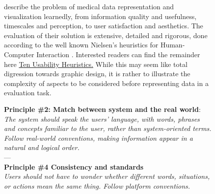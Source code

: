 \begin{figure}
    \footnotesize
\noindent
{}
\begin{tcolorbox}[sidebyside,arc=0.5mm, 
    colback=MidnightBlue!10!white, 
    coltext=MidnightBlue!90!black,  
    colframe=MidnightBlue!90!black,
    colbacktitle=MidnightBlue!80,
    leftrule=0mm,
    rightrule=0mm, 
    toprule=0mm, 
    bottomrule=0mm,
    box align=top,
    title={\begin{panel}Representation and visualisation \label{pan:visualisation}\end{panel}}]

\citeauthor{Ledesma2016-hn} describe the problem of medical data representation and visualization learnedly, from information quality and usefulness, timescales and perception, to user satisfaction and aesthetics. The evaluation of their solution is extensive, detailed and rigorous, done according to the well known Nielsen's heuristics for Human-Computer Interaction \cite{nielsend}.  Interested readers can find the remainder here \href{https://www.nngroup.com/articles/ten-usability-heuristics/}{Ten Usability Heuristics.} While this may seem like total digression towards graphic design, it is rather to illustrate the complexity of aspects to be considered before representing data in a evaluation task.
\tcblower

\textbf{Principle \#2: Match between system and the real world}:\\ \textit{The system should speak the users' language, with words, phrases and concepts familiar to the user, rather than system-oriented terms. Follow real-world conventions, making information appear in a natural and logical order. }
\\
---
\\
\textbf{Principle \#4 Consistency and standards}\\
\textit{Users should not have to wonder whether different words, situations, or actions mean the same thing. Follow platform conventions.
}

\end{tcolorbox}
\normalsize
\end{figure}